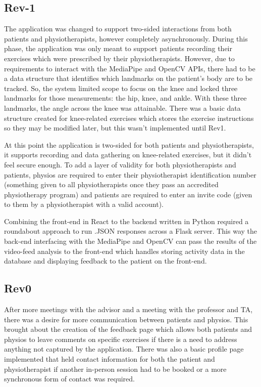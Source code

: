 \documentclass{article}
\begin{document}
\subsection{Rev-1}

The application was changed to support two-sided interactions from both patients and physiotherapists, however completely asynchronously. During this phase, the application was only meant to support patients recording their exercises which were prescribed by their physiotherapists. However, due to requirements to interact with the MediaPipe and OpenCV APIs, there had to be a data structure that identifies which landmarks on the patient’s body are to be tracked. So, the system limited scope to focus on the knee and locked three landmarks for those measurements: the hip, knee, and ankle. With these three landmarks, the angle across the knee was attainable. There was a basic data structure created for knee-related exercises which stores the exercise instructions so they may be modified later, but this wasn’t implemented until Rev1.

At this point the application is two-sided for both patients and physiotherapists, it supports recording and data gathering on knee-related exercises, but it didn’t feel secure enough. To add a layer of validity for both physiotherapists and patients, physios are required to enter their physiotherapist identification number (something given to all physiotherapists once they pass an accredited physiotherapy program) and patients are required to enter an invite code (given to them by a physiotherapist with a valid account).

Combining the front-end in React to the backend written in Python required a roundabout approach to run .JSON responses across a Flask server. This way the back-end interfacing with the MediaPipe and OpenCV can pass the results of the video-feed analysis to the front-end which handles storing activity data in the database and displaying feedback to the patient on the front-end.

\subsection{Rev0}

After more meetings with the advisor and a meeting with the professor and TA, there was a desire for more communication between patients and physios. This brought about the creation of the feedback page which allows both patients and physios to leave comments on specific exercises if there is a need to address anything not captured by the application. There was also a basic profile page implemented that held contact information for both the patient and physiotherapist if another in-person session had to be booked or a more synchronous form of contact was required.
\end{document}
